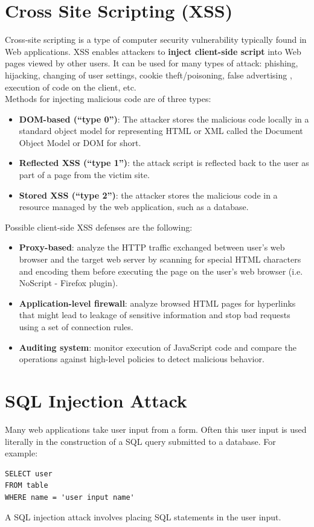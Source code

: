 \section{Cross Site Scripting (XSS)}
Cross-site scripting is a type of computer security vulnerability typically found in Web applications. XSS enables attackers to \textbf{inject client-side script} into Web pages viewed by other users. It can be used for many types of attack: phishing, hijacking, changing of user settings, cookie theft/poisoning, false advertising , execution of code on the client, etc. \\
Methods for injecting malicious code are of three types:
\begin{itemize}
	\item \textbf{DOM-based (“type 0”)}: The attacker stores the malicious code locally in a standard object model for representing HTML or XML called the Document Object Model or DOM for short.
	\item \textbf{Reflected XSS (“type 1”)}: the attack script is reflected back to the user as part of a page from the victim site.
	\item \textbf{Stored XSS (“type 2”)}: the attacker stores the malicious code in a resource managed by the web application, such as a database.
\end{itemize}
Possible client-side XSS defenses are the following:
\begin{itemize}
	\item \textbf{Proxy-based}: analyze the HTTP traffic exchanged between user’s web browser and the target web server by scanning for special HTML characters and encoding them before executing the page on the user’s web browser (i.e. NoScript -	Firefox plugin).
	\item \textbf{Application-level firewall}: analyze browsed HTML pages for hyperlinks that might lead to leakage of sensitive information and stop bad requests using a set of connection rules.
	\item \textbf{Auditing system}: monitor execution of JavaScript code and compare the operations against high-level policies to detect malicious behavior.
\end{itemize}

\section{SQL Injection Attack}
Many web applications take user input from a form. Often this user input is used literally in the construction of a SQL query submitted to a database. For example:
\begin{lstlisting}
SELECT user 
FROM table
WHERE name = 'user input name'
\end{lstlisting}
A SQL injection attack involves placing SQL statements in the user input.
